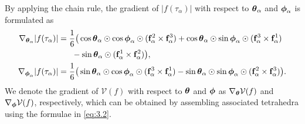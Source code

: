 \documentclass[11pt,a4paper]{article}
\begin{document}
By applying the chain rule, the gradient of $|f(\tau_{\alpha})|$ with respect to ${\boldsymbol{\theta}}_\alpha$ and ${\boldsymbol{\phi}}_\alpha$ is formulated as
\begin{subequations} \label{eq:3.2}
\begin{align}
\nabla_{{\boldsymbol{\theta}}_\alpha} |f(\tau_{\alpha})| &= \frac{1}{6} \big( \cos{\boldsymbol{\theta}}_\alpha \odot \cos{\boldsymbol{\phi}}_\alpha \odot (\mathbf{f}^2_\alpha \times \mathbf{f}^3_\alpha) + \cos{\boldsymbol{\theta}}_\alpha \odot \sin{\boldsymbol{\phi}}_\alpha \odot (\mathbf{f}^3_\alpha \times \mathbf{f}^1_\alpha) \\
& \quad ~~ - \sin{\boldsymbol{\theta}}_\alpha \odot (\mathbf{f}^1_\alpha \times \mathbf{f}^2_\alpha) \big), \nonumber\\
\nabla_{{\boldsymbol{\phi}}_\alpha} |f(\tau_{\alpha})| &= \frac{1}{6} \big( \sin{\boldsymbol{\theta}}_\alpha \odot \cos{\boldsymbol{\phi}}_\alpha \odot (\mathbf{f}^3_\alpha \times \mathbf{f}^1_\alpha) - \sin{\boldsymbol{\theta}}_\alpha \odot \sin{\boldsymbol{\phi}}_\alpha \odot (\mathbf{f}^2_\alpha \times \mathbf{f}^3_\alpha) \big).
\end{align}
\end{subequations}
We denote the gradient of $\mathcal{V}(f)$ with respect to ${\boldsymbol{\theta}}$ and ${\boldsymbol{\phi}}$ as $\nabla_{{\boldsymbol{\theta}}} \mathcal{V}(f)$ and $\nabla_{{\boldsymbol{\phi}}} \mathcal{V}(f)$, respectively, which can be obtained by assembling associated tetrahedra using the formulae in \eqref{eq:3.2}.
\end{document}
